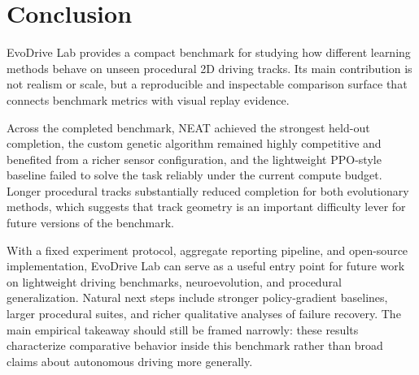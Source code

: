 \section{Conclusion}

EvoDrive Lab provides a compact benchmark for studying how different learning methods behave on unseen procedural 2D driving tracks. Its main contribution is not realism or scale, but a reproducible and inspectable comparison surface that connects benchmark metrics with visual replay evidence.

Across the completed benchmark, NEAT achieved the strongest held-out completion, the custom genetic algorithm remained highly competitive and benefited from a richer sensor configuration, and the lightweight PPO-style baseline failed to solve the task reliably under the current compute budget. Longer procedural tracks substantially reduced completion for both evolutionary methods, which suggests that track geometry is an important difficulty lever for future versions of the benchmark.

With a fixed experiment protocol, aggregate reporting pipeline, and open-source implementation, EvoDrive Lab can serve as a useful entry point for future work on lightweight driving benchmarks, neuroevolution, and procedural generalization. Natural next steps include stronger policy-gradient baselines, larger procedural suites, and richer qualitative analyses of failure recovery. The main empirical takeaway should still be framed narrowly: these results characterize comparative behavior inside this benchmark rather than broad claims about autonomous driving more generally.

